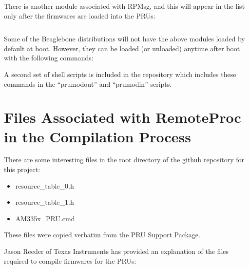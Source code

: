 There is another module associated with RPMsg, and this will appear in the list only after the firmwares are loaded into the PRUs:

\begin{verbatim}

\end{verbatim}

Some of the Beaglebone distributions will not have the above modules loaded by default at boot.  However, they can be loaded (or unloaded) anytime after boot with the following commands:

A second set of shell scripts is included in the repository which includes these commands in the ``prumodout'' and ``prumodin'' scripts.

\section{Files Associated with RemoteProc in the Compilation Process}

There are some interesting files in the root directory of the github repository for this project:

\begin{itemize}
\item resource\_table\_0.h
\item resource\_table\_1.h
\item AM335x\_PRU.cmd
\end{itemize}

These files were copied verbatim from the PRU Support Package.

Jason Reeder of Texas Instruments has provided an explanation of the files required to compile firmwares for the PRUs:

